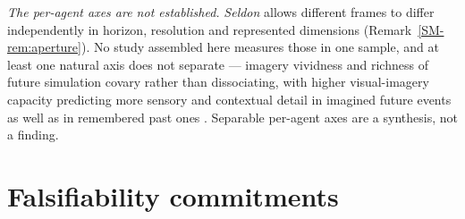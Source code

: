 \documentclass[11pt,a4paper]{article}
\theoremstyle{remark}
\begin{document}
\emph{The per-agent axes are not established.} \emph{Seldon} allows different frames to differ
independently in horizon, resolution and represented dimensions (Remark~\ref{SM-rem:aperture}).
No study assembled here measures
those in one sample, and at least one natural axis does not separate --- imagery vividness and
richness of future simulation covary rather than dissociating, with higher visual-imagery capacity
predicting more sensory and contextual detail in imagined future events as well as in remembered past
ones \citep{dargembeau2006}. Separable per-agent axes are a synthesis, not a finding.

\section{Falsifiability commitments}\label{sec:falsifiability}
\end{document}
